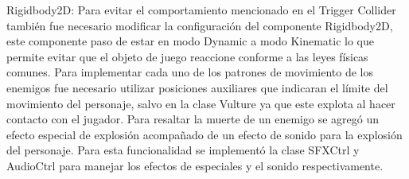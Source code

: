 \begin{itemize}
Rigidbody2D: Para evitar el comportamiento mencionado en el Trigger Collider también fue necesario modificar la configuración del componente Rigidbody2D, este componente paso de estar en modo Dynamic a modo Kinematic lo que permite evitar que el objeto de juego reaccione conforme a las leyes físicas comunes.   
Para implementar cada uno de los patrones de movimiento de los enemigos fue necesario utilizar posiciones auxiliares que indicaran el límite del movimiento del personaje, salvo en la clase Vulture ya que este explota al hacer contacto con el jugador.
Para resaltar la muerte de un enemigo se agregó un efecto especial de explosión acompañado de un efecto de sonido para la explosión del personaje. Para esta funcionalidad se implementó la clase SFXCtrl y AudioCtrl para manejar los efectos de especiales y el sonido respectivamente.
	\end{itemize}

